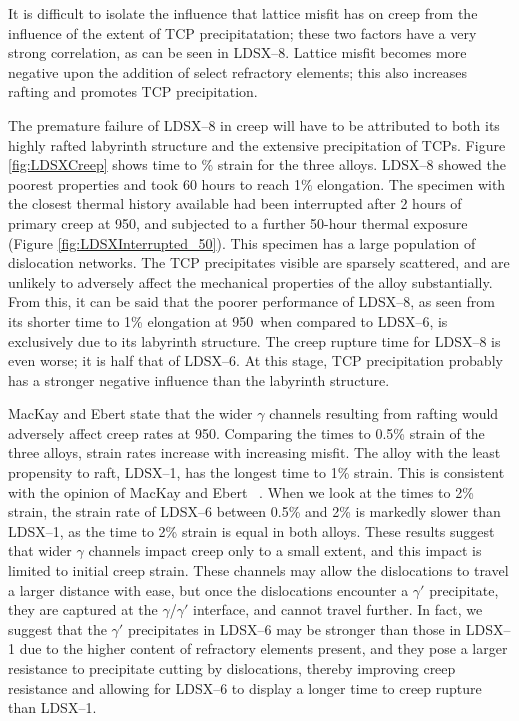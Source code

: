 It is difficult to isolate the influence that lattice misfit has on creep from the influence of the extent of TCP precipitatation; these two factors have a very strong correlation, as can be seen in LDSX--8.  Lattice misfit becomes more negative upon the addition of select refractory elements; this also increases rafting and promotes TCP precipitation. 

The premature failure of LDSX--8 in creep will have to be attributed to both its highly rafted labyrinth structure and the extensive precipitation of TCPs.  Figure \ref{fig:LDSXCreep} shows time to \% strain for the three alloys.  LDSX--8 showed the poorest properties and took 60 hours to reach 1\% elongation.  The specimen with the closest thermal history available had been interrupted after 2 hours of primary creep at 950\celsius, and subjected to a further 50-hour thermal exposure (Figure \ref{fig:LDSXInterrupted_50}).  This specimen has a large population of dislocation networks.  The TCP precipitates visible are sparsely scattered, and are unlikely to adversely affect the mechanical properties of the alloy substantially.  From this, it can be said that the poorer performance of LDSX--8, as seen from its shorter time to 1\% elongation at 950\celsius\ when compared to LDSX--6, is exclusively due to its labyrinth structure.  The creep rupture time for LDSX--8 is even worse; it is half that of LDSX--6.  At this stage, TCP precipitation probably has a stronger negative influence than the labyrinth structure.

MacKay and Ebert state that the wider $\gamma$ channels resulting from rafting would adversely affect creep rates at 950\celsius.  Comparing the times to 0.5\% strain of the three alloys, strain rates increase with increasing misfit.  The alloy with the least propensity to raft, LDSX--1, has the longest time to 1\% strain.  This is consistent with the opinion of MacKay and Ebert ~\cite{mackay83}.  When we look at the times to 2\% strain, the strain rate of LDSX--6 between 0.5\% and 2\% is markedly slower than LDSX--1, as the time to 2\% strain is equal in both alloys.  These results suggest that wider $\gamma$ channels impact creep only to a small extent, and this impact is limited to initial creep strain.  These channels may allow the dislocations to travel a larger distance with ease, but once the dislocations encounter a $\gamma'$ precipitate, they are captured at the $\gamma$/$\gamma'$ interface, and cannot travel further.  In fact, we suggest that the $\gamma'$ precipitates in LDSX--6 may be stronger than those in LDSX--1 due to the higher content of refractory elements present, and they pose a larger resistance to precipitate cutting by dislocations, thereby improving creep resistance and allowing for LDSX--6 to display a longer time to creep rupture than LDSX--1.

